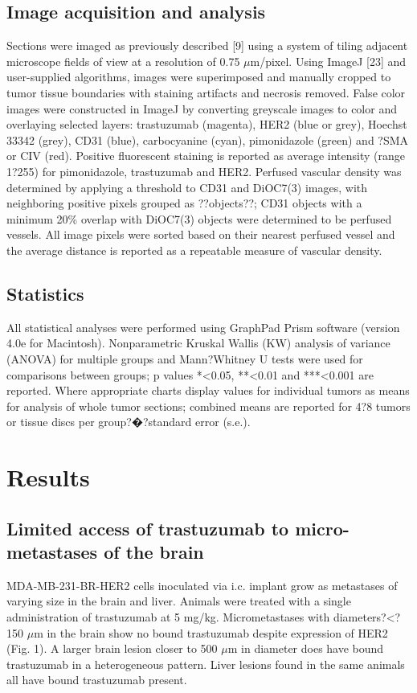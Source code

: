 \subsection{Image acquisition and analysis}
Sections were imaged as previously described [9] using a system of tiling adjacent microscope fields of view at a resolution of 0.75 $\mu$m/pixel.
Using ImageJ [23] and user-supplied algorithms, images were superimposed and manually cropped to tumor tissue boundaries with staining artifacts and necrosis removed.
False color images were constructed in ImageJ by converting greyscale images to color and overlaying selected layers: trastuzumab (magenta), HER2 (blue or grey), Hoechst 33342 (grey), CD31 (blue), carbocyanine (cyan), pimonidazole (green) and ?SMA or CIV (red).
Positive fluorescent staining is reported as average intensity (range 1?255) for pimonidazole, trastuzumab and HER2.
Perfused vascular density was determined by applying a threshold to CD31 and DiOC7(3) images, with neighboring positive pixels grouped as ??objects??; CD31 objects with a minimum 20\% overlap with DiOC7(3) objects were determined to be perfused vessels.
All image pixels were sorted based on their nearest perfused vessel and the average distance is reported as a repeatable measure of vascular density.

\subsection{Statistics}
All statistical analyses were performed using GraphPad Prism software (version 4.0e for Macintosh).
Nonparametric Kruskal Wallis (KW) analysis of variance (ANOVA) for multiple groups and Mann?Whitney U tests were used for comparisons between groups; p values *<0.05, **<0.01 and ***<0.001 are reported.
Where appropriate charts display values for individual tumors as means for analysis of whole tumor sections; combined means are reported for 4?8 tumors or tissue discs per group?�?standard error (s.e.).

\section{Results}

\subsection{Limited access of trastuzumab to micro-metastases of the brain}
MDA-MB-231-BR-HER2 cells inoculated via i.c.
implant grow as metastases of varying size in the brain and liver.
Animals were treated with a single administration of trastuzumab at 5 mg/kg.
Micrometastases with diameters?<?150 $\mu$m in the brain show no bound trastuzumab despite expression of HER2 (Fig.
1).
A larger brain lesion closer to 500 $\mu$m in diameter does have bound trastuzumab in a heterogeneous pattern.
Liver lesions found in the same animals all have bound trastuzumab present.

